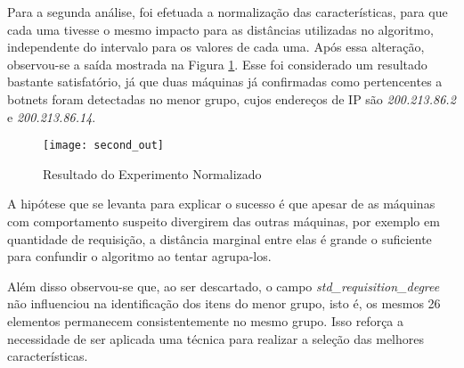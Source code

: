 Para a segunda análise, foi efetuada a normalização das características, para que cada uma tivesse o mesmo impacto para as distâncias utilizadas no algoritmo, independente do intervalo para os valores de cada uma. Após essa alteração, observou-se a saída mostrada na Figura \ref{fig:second_out}. Esse foi considerado um resultado bastante satisfatório, já que duas máquinas já confirmadas como pertencentes a botnets foram detectadas no menor grupo, cujos endereços de IP são \textit{200.213.86.2} e \textit{200.213.86.14}.

\begin{figure}[htbp]
\centering
\texttt{[image: second\_out]}
\caption[Resultado do Experimento Normalizado]{Resultado do Experimento Normalizado} \label{fig:second_out}
\end{figure}

A hipótese que se levanta para explicar o sucesso é que apesar de as máquinas com comportamento suspeito divergirem das outras máquinas, por exemplo em quantidade de requisição, a distância marginal entre elas é grande o suficiente para confundir o algoritmo ao tentar agrupa-los.

Além disso observou-se que, ao ser descartado, o campo \textit{std\_requisition\_degree} não influenciou na identificação dos itens do menor grupo, isto é, os mesmos 26 elementos permanecem consistentemente no mesmo grupo. Isso reforça a necessidade de ser aplicada uma técnica para realizar a seleção das melhores características.